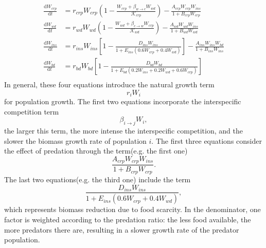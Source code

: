 \documentclass{HZNUMCM}
\begin{document}
      \begin{equation}
        \begin{aligned}
          \frac{\mathrm{d}W_{crp}}{\mathrm{d}t}&=r_{crp}W_{crp}\left( 1-\frac{W_{crp}+\beta _{w\rightarrow c}W_{wd}}{\mathscr{K} _{crp}} \right) -\frac{A_{crp}W_{crp}W_{ins}}{1+B_{crp}W_{crp}}\\
          \frac{\mathrm{d}W_{wd}}{\mathrm{d}t}&=r_{wd}W_{wd}\left( 1-\frac{W_{wd}+\beta _{c\rightarrow w}W_{crp}}{\mathscr{K} _{wd}} \right) -\frac{A_{wd}W_{wd}W_{ins}}{1+B_{wd}W_{wd}}\\
          \frac{\mathrm{d}W_{ins}}{\mathrm{d}t}&=r_{ins}W_{ins}\left[ 1-\frac{D_{ins}W_{ins}}{1+E_{ins}\left( 0.6W_{crp}+0.4W_{wd} \right)} \right] -\frac{A_{ins}W_{ins}W_{bd}}{1+B_{ins}W_{ins}}\\
          \frac{\mathrm{d}W_{bd}}{\mathrm{d}t} &= r_{bd}W_{bd} \left[ 1 - \frac{D_{bd}W_{bd}}{1 + E_{bd}(0.2W_{ins} + 0.2W_{wd} + 0.6W_{crp})} \right]\\
        \end{aligned} 
      \end{equation}
      In general, these four equations introduce the natural growth term 
      \begin{equation}
        r_i W_i
      \end{equation}
      for population growth. 
      The first two equations incorporate the interspecific competition term 
      \begin{equation}
        \beta_{i \rightarrow j} W_i,
      \end{equation}
      the larger this term, the more intense the interspecific competition, and the slower the biomass growth rate of population $i$. 
      The first three equations consider the effect of predation through the term(e.g. the first one) 
      \begin{equation}
        \frac{A_{crp} W_{crp} W_{ins}}{1 + B_{crp} W_{crp}}. 
      \end{equation}
      The last two equations(e.g. the third one) include the term 
      \begin{equation}
        \frac{D_{ins} W_{ins}}{1 + E_{ins} \left( 0.6 W_{crp} + 0.4 W_{wd} \right)},
      \end{equation}
      which represents biomass reduction due to food scarcity. 
      In the denominator, one factor is weighted according to the predation ratio: the less food available, 
      the more predators there are, resulting in a slower growth rate of the predator population.
\end{document}
